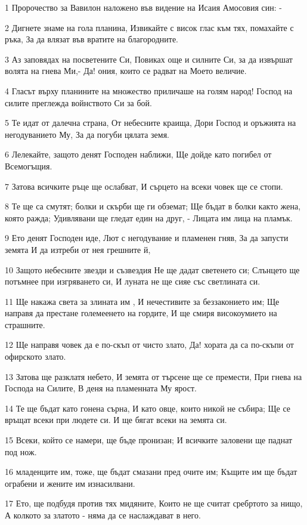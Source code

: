 \par 1 Пророчество за Вавилон наложено във видение на Исаия Амосовия син: -
\par 2 Дигнете знаме на гола планина, Извикайте с висок глас към тях, помахайте с ръка, За да влязат във вратите на благородните.
\par 3 Аз заповядах на посветените Си, Повиках още и силните Си, за да извършат волята на гнева Ми,- Да! ония, които се радват на Моето величие.
\par 4 Гласът върху планините на множество приличаше на голям народ! Господ на силите преглежда войнството Си за бой.
\par 5 Те идат от далечна страна, От небесните краища, Дори Господ и оръжията на негодуванието Му, За да погуби цялата земя.
\par 6 Лелекайте, защото денят Господен наближи, Ще дойде като погибел от Всемогъщия.
\par 7 Затова всичките ръце ще ослабват, И сърцето на всеки човек ще се стопи.
\par 8 Те ще са смутят; болки и скърби ще ги обземат; Ще бъдат в болки както жена, която ражда; Удивлявани ще гледат един на друг, - Лицата им лица на пламък.
\par 9 Ето денят Господен иде, Лют с негодувание и пламенен гняв, За да запусти земята И да изтреби от нея грешните й,
\par 10 Защото небесните звезди и съзвездия Не ще дадат светенето си; Слънцето ще потъмнее при изгряването си, И луната не ще сияе със светлината си.
\par 11 Ще накажа света за злината им , И нечестивите за беззаконието им; Ще направя да престане големеенето на гордите, И ще смиря високоумието на страшните.
\par 12 Ще направя човек да е по-скъп от чисто злато, Да! хората да са по-скъпи от офирското злато.
\par 13 Затова ще разклатя небето, И земята от търсене ще се премести, При гнева на Господа на Силите, В деня на пламенната Му ярост.
\par 14 Те ще бъдат като гонена сърна, И като овце, които никой не събира; Ще се връщат всеки при людете си. И ще бягат всеки на земята си.
\par 15 Всеки, който се намери, ще бъде пронизан; И всичките заловени ще паднат под нож.
\par 16 младенците им, тоже, ще бъдат смазани пред очите им; Къщите им ще бъдат ограбени и жените им изнасилвани.
\par 17 Ето, ще подбудя против тях мидяните, Които не ще считат сребртото за нищо, А колкото за златото - няма да се наслаждават в него.

